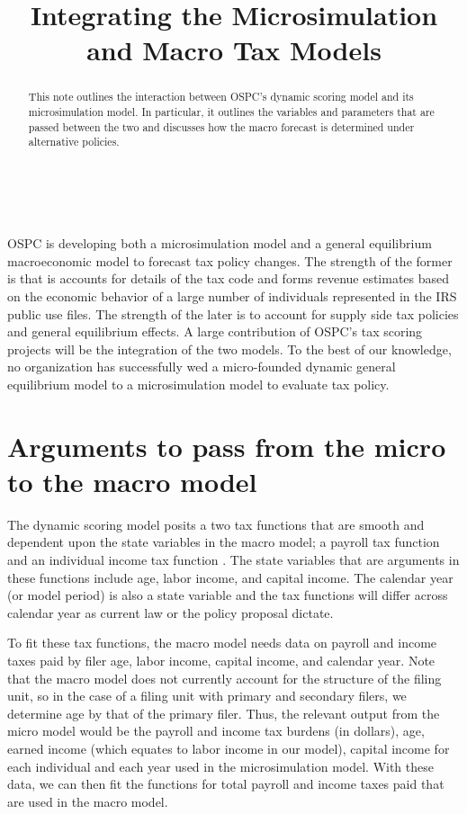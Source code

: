 \documentclass[letterpaper,11pt]{article}
\theoremstyle{definition}
\begin{document}
\title{Integrating the Microsimulation and Macro Tax Models}
\maketitle

\begin{abstract}
\small{This note outlines the interaction between OSPC's dynamic scoring model and its microsimulation model.  In particular, it outlines the variables and parameters that are passed between the two and discusses how the macro forecast is determined under alternative policies.}
\end{abstract}

\ \\
\ \\

OSPC is developing both a microsimulation model and a general equilibrium macroeconomic model to forecast tax policy changes.  The strength of the former is that is accounts for details of the tax code and forms revenue estimates based on the economic behavior of a large number of individuals represented in the IRS public use files.  The strength of the later is to account for supply side tax policies and general equilibrium effects.  A large contribution of OSPC's tax scoring projects will be the integration of the two models.  To the best of our knowledge, no organization has successfully wed a micro-founded dynamic general equilibrium model to a microsimulation model to evaluate tax policy.  

\section{Arguments to pass from the micro to the macro model}

The dynamic scoring model posits a two tax functions that are smooth and dependent upon the state variables in the macro model; a payroll tax function and an individual income tax function .  The state variables that are arguments in these functions include age, labor income, and capital income.  The calendar year (or model period) is also a state variable and the tax functions will differ across calendar year as current law or the policy proposal dictate.  

To fit these tax functions, the macro model needs data on payroll and income taxes paid by filer age, labor income, capital income, and calendar year.  Note that the macro model does not currently account for the structure of the filing unit, so in the case of a filing unit with primary and secondary filers, we determine age by that of the primary filer.  Thus, the relevant output from the micro model would be the payroll and income tax burdens (in dollars), age, earned income (which equates to labor income in our model), capital income for each individual and each year used in the microsimulation model.  With these data, we can then fit the functions for total payroll and income taxes paid that are used in the macro model.
\end{document}
